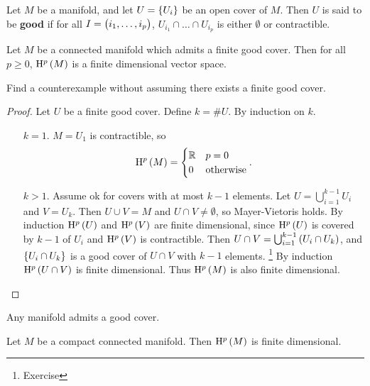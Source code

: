 \begin{definition}
Let $ M $ be a manifold, and let $ U = \cbr{U_i} $ be an open cover of $ M $. Then $ U $ is said to be \textbf{good} if for all $ I = \br{i_1, \dots, i_p} $, $ U_{i_1} \cap \dots \cap U_{i_p} $ is either $ \emptyset $ or contractible.
\end{definition}

\begin{lemma}
\label{lem:2.35}
Let $ M $ be a connected manifold which admits a finite good cover. Then for all $ p \ge 0 $, $ \H^p\br{M} $ is a finite dimensional vector space.
\end{lemma}

\begin{exercise*}
Find a counterexample without assuming there exists a finite good cover.
\end{exercise*}

\begin{proof}
Let $ U $ be a finite good cover. Define $ k = \#U $. By induction on $ k $.
\begin{itemize}[leftmargin=0.5in]
\item[$ k = 1 $.] $ M = U_1 $ is contractible, so
$$ \H^p\br{M} =
\begin{cases}
\RR & p = 0 \\
0 & \text{otherwise}
\end{cases}.
$$
\item[$ k > 1 $.] Assume ok for covers with at most $ k - 1 $ elements. Let $ U = \bigcup_{i = 1}^{k - 1} U_i $ and $ V = U_k $. Then $ U \cup V = M $ and $ U \cap V \ne \emptyset $, so Mayer-Vietoris holds. By induction $ \H^p\br{U} $ and $ \H^p\br{V} $ are finite dimensional, since $ \H^p\br{U} $ is covered by $ k - 1 $ of $ U_i $ and $ \H^p\br{V} $ is contractible. Then $ U \cap V = \bigcup_{i = 1}^{k - 1} \br{U_i \cap U_k} $, and $ \cbr{U_i \cap U_k} $ is a good cover of $ U \cap V $ with $ k - 1 $ elements. \footnote{Exercise} By induction $ \H^p\br{U \cap V} $ is finite dimensional. Thus $ \H^p\br{M} $ is also finite dimensional.
\end{itemize}
\end{proof}

\pagebreak

\begin{fact*}
Any manifold admits a good cover.
\end{fact*}

\begin{theorem}
Let $ M $ be a compact connected manifold. Then $ \H^p\br{M} $ is finite dimensional.
\end{theorem}

